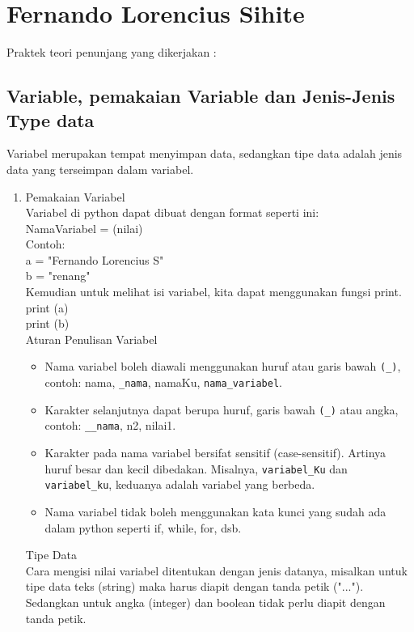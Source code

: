 \section{Fernando Lorencius Sihite}
Praktek teori penunjang yang dikerjakan :
\subsection{Variable, pemakaian Variable dan Jenis-Jenis Type data}
Variabel merupakan tempat menyimpan data, sedangkan tipe data adalah jenis data yang terseimpan dalam variabel.\\


\begin{enumerate}
\item Pemakaian Variabel\\
Variabel di python dapat dibuat dengan format seperti ini:\\
NamaVariabel = (nilai)\\
Contoh:\\
a = "Fernando Lorencius S"\\
b = "renang"\\
Kemudian untuk melihat isi variabel, kita dapat menggunakan fungsi print.\\
print (a)\\
print (b)\\
Aturan Penulisan Variabel\\
\begin{itemize}
\item Nama variabel boleh diawali menggunakan huruf atau garis bawah \verb|(_)|, contoh: nama, \verb|_nama|, namaKu, \verb|nama_variabel|.
\item Karakter selanjutnya dapat berupa huruf, garis bawah \verb|(_)| atau angka, contoh: \verb|__nama|, n2, nilai1.
\item Karakter pada nama variabel bersifat sensitif (case-sensitif). Artinya huruf besar dan kecil dibedakan. Misalnya, \verb|variabel_Ku| dan \verb|variabel_ku|, keduanya adalah variabel yang berbeda.
\item Nama variabel tidak boleh menggunakan kata kunci yang sudah ada dalam python seperti if, while, for, dsb.
\end{itemize}
Tipe Data\\
Cara mengisi nilai variabel ditentukan dengan jenis datanya, misalkan untuk tipe data teks (string) maka harus diapit dengan tanda petik ("..."). Sedangkan untuk angka (integer) dan boolean tidak perlu diapit dengan tanda petik.\\

\end{enumerate}
